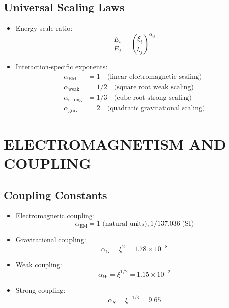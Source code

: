 \documentclass[12pt,a4paper]{article}
\begin{document}
	\subsection{Universal Scaling Laws}
	\begin{itemize}
		\item Energy scale ratio:
		$$\frac{E_i}{E_j} = \left(\frac{\xi_i}{\xi_j}\right)^{\alpha_{ij}}$$
		
		\item Interaction-specific exponents:
		\begin{align*}
			\alpha_{\text{EM}} &= 1 \quad \text{(linear electromagnetic scaling)}\\
			\alpha_{\text{weak}} &= 1/2 \quad \text{(square root weak scaling)}\\
			\alpha_{\text{strong}} &= 1/3 \quad \text{(cube root strong scaling)}\\
			\alpha_{\text{grav}} &= 2 \quad \text{(quadratic gravitational scaling)}
		\end{align*}
	\end{itemize}
	
	\section{ELECTROMAGNETISM AND COUPLING}
	
	\subsection{Coupling Constants}
\begin{itemize}
	\item Electromagnetic coupling:
	$$\alpha_{\text{EM}} = 1 \text{ (natural units)}, 1/137.036 \text{ (SI)}$$
	
	\item Gravitational coupling:
	$$\alpha_G = \xi^2 = 1.78 \times 10^{-8}$$
	
	\item Weak coupling:
	$$\alpha_W = \xi^{1/2} = 1.15 \times 10^{-2}$$
	
	\item Strong coupling:
	$$\alpha_S = \xi^{-1/3} = 9.65$$
\end{itemize}
\end{document}
